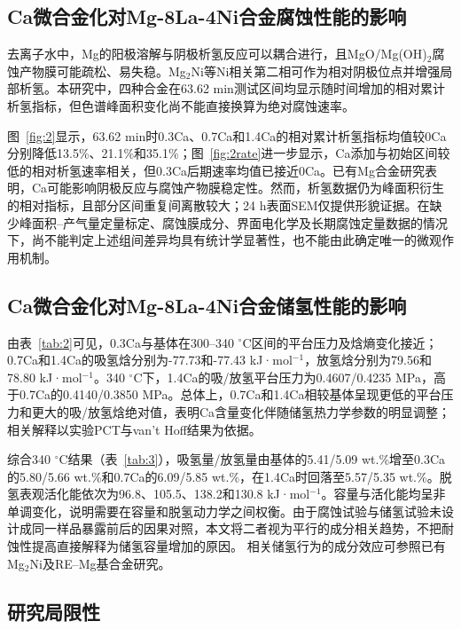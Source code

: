 \documentclass[preprint,12pt]{elsarticle}
\begin{document}
\subsection{Ca微合金化对Mg-8La-4Ni合金腐蚀性能的影响}

去离子水中，Mg的阳极溶解与阴极析氢反应可以耦合进行，且MgO/Mg(OH)$_2$腐蚀产物膜可能疏松、易失稳\cite{ref9}。Mg$_2$Ni等Ni相关第二相可作为相对阴极位点并增强局部析氢\cite{ref10}。本研究中，四种合金在63.62 min测试区间均显示随时间增加的相对累计析氢指标，但色谱峰面积变化尚不能直接换算为绝对腐蚀速率。

图~\ref{fig:2}显示，63.62 min时0.3Ca、0.7Ca和1.4Ca的相对累计析氢指标均值较0Ca分别降低13.5\%、21.1\%和35.1\%；图~\ref{fig:2rate}进一步显示，Ca添加与初始区间较低的相对析氢速率相关，但0.3Ca后期速率均值已接近0Ca。已有Mg合金研究表明，Ca可能影响阴极反应与腐蚀产物膜稳定性\cite{ref8,ref12}。然而，析氢数据仍为峰面积衍生的相对指标，且部分区间重复间离散较大；24 h表面SEM仅提供形貌证据。在缺少峰面积--产气量定量标定、腐蚀膜成分、界面电化学及长期腐蚀定量数据的情况下，尚不能判定上述组间差异均具有统计学显著性，也不能由此确定唯一的微观作用机制。

\subsection{Ca微合金化对Mg-8La-4Ni合金储氢性能的影响}

由表~\ref{tab:2}可见，0.3Ca与基体在300–340 $^\circ$C区间的平台压力及焓熵变化接近；0.7Ca和1.4Ca的吸氢焓分别为-77.73和-77.43 kJ·mol$^{-1}$，放氢焓分别为79.56和78.80 kJ·mol$^{-1}$。340 $^\circ$C下，1.4Ca的吸/放氢平台压力为0.4607/0.4235 MPa，高于0.7Ca的0.4140/0.3850 MPa。总体上，0.7Ca和1.4Ca相较基体呈现更低的平台压力和更大的吸/放氢焓绝对值，表明Ca含量变化伴随储氢热力学参数的明显调整；相关解释以实验PCT与van’t Hoff结果为依据\cite{ref13}。

综合340 $^\circ$C结果（表~\ref{tab:3}），吸氢量/放氢量由基体的5.41/5.09 wt.\%增至0.3Ca的5.80/5.66 wt.\%和0.7Ca的6.09/5.85 wt.\%，在1.4Ca时回落至5.57/5.35 wt.\%。脱氢表观活化能依次为96.8、105.5、138.2和130.8 kJ·mol$^{-1}$。容量与活化能均呈非单调变化，说明需要在容量和脱氢动力学之间权衡。由于腐蚀试验与储氢试验未设计成同一样品暴露前后的因果对照，本文将二者视为平行的成分相关趋势，不把耐蚀性提高直接解释为储氢容量增加的原因。 相关储氢行为的成分效应可参照已有Mg$_2$Ni及RE–Mg基合金研究\cite{ref14,ref15}。

\subsection{研究局限性}
\end{document}
